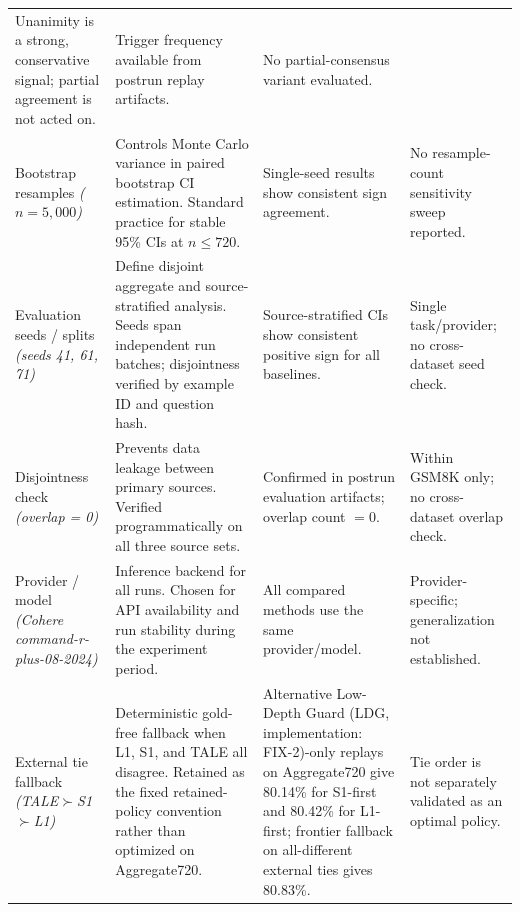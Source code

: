 \begin{table}[H]
{\begin{tabular}{p{}p{}p{}p{}}
  Unanimity is a strong, conservative signal; partial agreement is not acted on. &
  Trigger frequency available from postrun replay artifacts. &
  No partial-consensus variant evaluated. \\
\addlinespace
Bootstrap resamples \newline \textit{($n = 5{,}000$)} &
  Controls Monte Carlo variance in paired bootstrap CI estimation.
  Standard practice for stable 95\% CIs at $n \leq 720$. &
  Single-seed results show consistent sign agreement. &
  No resample-count sensitivity sweep reported. \\
\addlinespace
Evaluation seeds / splits \newline \textit{(seeds 41, 61, 71)} &
  Define disjoint aggregate and source-stratified analysis.
  Seeds span independent run batches; disjointness verified by example ID and question hash. &
  Source-stratified CIs show consistent positive sign for all baselines. &
  Single task/provider; no cross-dataset seed check. \\
\addlinespace
Disjointness check \newline \textit{(overlap = 0)} &
  Prevents data leakage between primary sources.
  Verified programmatically on all three source sets. &
  Confirmed in postrun evaluation artifacts; overlap count $= 0$. &
  Within GSM8K only; no cross-dataset overlap check. \\
\addlinespace
Provider / model \newline \textit{(Cohere command-r-plus-08-2024)} &
  Inference backend for all runs.
  Chosen for API availability and run stability during the experiment period. &
  All compared methods use the same provider/model. &
  Provider-specific; generalization not established. \\
\addlinespace
External tie fallback \newline \textit{(TALE$\succ$S1$\succ$L1)} &
  Deterministic gold-free fallback when L1, S1, and TALE all disagree.
  Retained as the fixed retained-policy convention rather than optimized on Aggregate720. &
  Alternative Low-Depth Guard (LDG, implementation: FIX-2)-only replays on Aggregate720 give 80.14\% for S1-first and 80.42\% for L1-first; frontier fallback on all-different external ties gives 80.83\%. &
  Tie order is not separately validated as an optimal policy. \\
\bottomrule
\end{tabular}}
\end{table}
